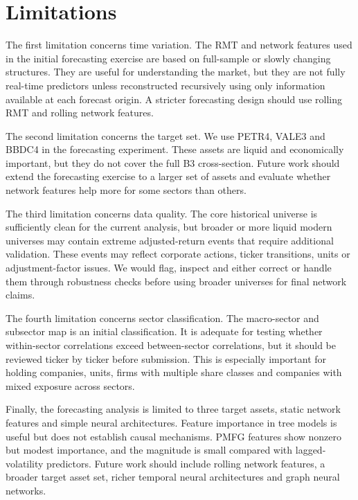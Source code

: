 \section{Limitations}
\label{sec:limitations}

The first limitation concerns time variation. The RMT and network features used in the initial forecasting exercise are based on full-sample or slowly changing structures. They are useful for understanding the market, but they are not fully real-time predictors unless reconstructed recursively using only information available at each forecast origin. A stricter forecasting design should use rolling RMT and rolling network features.

The second limitation concerns the target set. We use PETR4, VALE3 and BBDC4 in the forecasting experiment. These assets are liquid and economically important, but they do not cover the full B3 cross-section. Future work should extend the forecasting exercise to a larger set of assets and evaluate whether network features help more for some sectors than others.

The third limitation concerns data quality. The core historical universe is sufficiently clean for the current analysis, but broader or more liquid modern universes may contain extreme adjusted-return events that require additional validation. These events may reflect corporate actions, ticker transitions, units or adjustment-factor issues. We would flag, inspect and either correct or handle them through robustness checks before using broader universes for final network claims.

The fourth limitation concerns sector classification. The macro-sector and subsector map is an initial classification. It is adequate for testing whether within-sector correlations exceed between-sector correlations, but it should be reviewed ticker by ticker before submission. This is especially important for holding companies, units, firms with multiple share classes and companies with mixed exposure across sectors.

Finally, the forecasting analysis is limited to three target assets, static network features and simple neural architectures. Feature importance in tree models is useful but does not establish causal mechanisms. PMFG features show nonzero but modest importance, and the magnitude is small compared with lagged-volatility predictors. Future work should include rolling network features, a broader target asset set, richer temporal neural architectures and graph neural networks.
